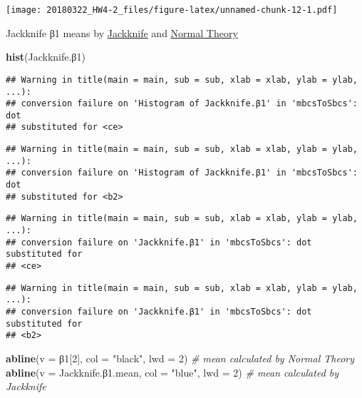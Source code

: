 \documentclass[]{article}
\newenvironment{Shaded}{\begin{snugshade}}{\end{snugshade}}
\newcommand{\KeywordTok}[1]{\textcolor[rgb]{0.13,0.29,0.53}{\textbf{{#1}}}}
\newcommand{\DataTypeTok}[1]{\textcolor[rgb]{0.13,0.29,0.53}{{#1}}}
\newcommand{\DecValTok}[1]{\textcolor[rgb]{0.00,0.00,0.81}{{#1}}}
\newcommand{\FloatTok}[1]{\textcolor[rgb]{0.00,0.00,0.81}{{#1}}}
\newcommand{\StringTok}[1]{\textcolor[rgb]{0.31,0.60,0.02}{{#1}}}
\newcommand{\CommentTok}[1]{\textcolor[rgb]{0.56,0.35,0.01}{\textit{{#1}}}}
\newcommand{\NormalTok}[1]{{#1}}
\begin{document}
\texttt{[image: 20180322\_HW4-2\_files/figure-latex/unnamed-chunk-12-1.pdf]}

Jackknife β1 means by \href{blue}{Jackknife} and \href{black}{Normal
Theory}

\begin{Shaded}
\begin{Highlighting}[]
\KeywordTok{hist}\NormalTok{(Jackknife.β}\DecValTok{1}\NormalTok{)}
\end{Highlighting}
\end{Shaded}

\begin{verbatim}
## Warning in title(main = main, sub = sub, xlab = xlab, ylab = ylab, ...):
## conversion failure on 'Histogram of Jackknife.β1' in 'mbcsToSbcs': dot
## substituted for <ce>
\end{verbatim}

\begin{verbatim}
## Warning in title(main = main, sub = sub, xlab = xlab, ylab = ylab, ...):
## conversion failure on 'Histogram of Jackknife.β1' in 'mbcsToSbcs': dot
## substituted for <b2>
\end{verbatim}

\begin{verbatim}
## Warning in title(main = main, sub = sub, xlab = xlab, ylab = ylab, ...):
## conversion failure on 'Jackknife.β1' in 'mbcsToSbcs': dot substituted for
## <ce>
\end{verbatim}

\begin{verbatim}
## Warning in title(main = main, sub = sub, xlab = xlab, ylab = ylab, ...):
## conversion failure on 'Jackknife.β1' in 'mbcsToSbcs': dot substituted for
## <b2>
\end{verbatim}

\begin{Shaded}
\begin{Highlighting}[]
\KeywordTok{abline}\NormalTok{(}\DataTypeTok{v =} \NormalTok{β}\DecValTok{1}\NormalTok{[}\DecValTok{2}\NormalTok{], }\DataTypeTok{col =} \StringTok{"black"}\NormalTok{, }\DataTypeTok{lwd =} \DecValTok{2}\NormalTok{) }\CommentTok{# mean calculated by Normal Theory}
\KeywordTok{abline}\NormalTok{(}\DataTypeTok{v =} \NormalTok{Jackknife.β}\FloatTok{1.}\NormalTok{mean, }\DataTypeTok{col =} \StringTok{"blue"}\NormalTok{, }\DataTypeTok{lwd =} \DecValTok{2}\NormalTok{) }\CommentTok{# mean calculated by Jackknife}
\end{Highlighting}
\end{Shaded}
\end{document}
